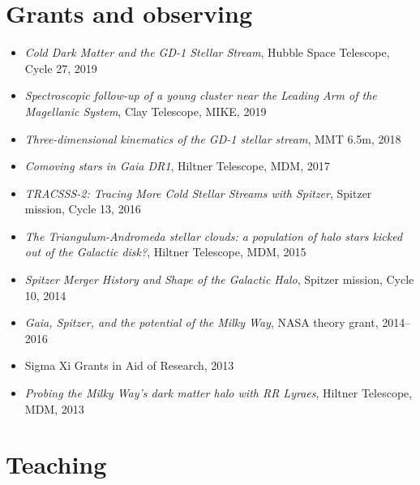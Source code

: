\documentclass[12pt, letterpaper]{apw-cv}
\begin{document}
\section*{Grants and observing}

    \begin{itemize}
    \item {\it Cold Dark Matter and the GD-1 Stellar Stream}, Hubble Space Telescope, Cycle 27, 2019
    \item {\it Spectroscopic follow-up of a young cluster near the Leading Arm of the Magellanic System}, Clay Telescope, MIKE, 2019
    \item {\it Three-dimensional kinematics of the GD-1 stellar stream}, MMT 6.5m, 2018 %
    \item {\it Comoving stars in Gaia DR1}, Hiltner Telescope, MDM, 2017 %
    \item {\it TRACSSS-2: Tracing More Cold Stellar Streams with Spitzer}, Spitzer mission, Cycle 13, 2016 %
	\item {\it The Triangulum-Andromeda stellar clouds: a population of halo stars kicked out of the Galactic disk?}, Hiltner Telescope, MDM, 2015 %
	\item {\it Spitzer Merger History and Shape of the Galactic Halo}, Spitzer mission, Cycle 10, 2014 %
	\item {\it Gaia, Spitzer, and the potential of the Milky Way}, NASA theory grant, 2014--2016 %
	\item Sigma Xi Grants in Aid of Research, 2013 %
	\item {\it Probing the Milky Way's dark matter halo with RR Lyraes}, Hiltner Telescope, MDM, 2013 %
	\end{itemize}

\section*{Teaching}
\end{document}
